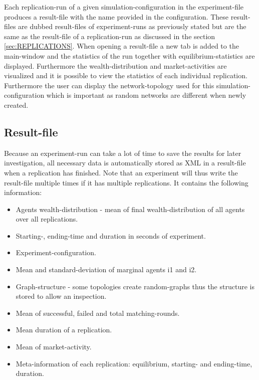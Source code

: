 \documentclass[Bachelorarbeit.tex]{subfiles}
\begin{document}
\medskip

Each replication-run of a given simulation-configuration in the experiment-file produces a result-file with the name provided in the configuration. These result-files are dubbed result-files of experiment-runs as previously stated but are the same as the result-file of a replication-run as discussed in the section \ref{sec:REPLICATIONS}.
When opening a result-file a new tab is added to the main-window and the statistics of the run together with equilibrium-statistics are displayed. Furthermore the wealth-distribution and market-activities are visualized and it is possible to view the statistics of each individual replication. Furthermore the user can display the network-topology used for this simulation-configuration which is important as random networks are different when newly created.

\subsection{Result-file}
Because an experiment-run can take a lot of time to save the results for later investigation, all necessary data is automatically stored as XML in a result-file when a replication has finished. Note that an experiment will thus write the result-file multiple times if it has multiple replications. It contains the following information:

\begin{itemize}
\item Agents wealth-distribution - mean of final wealth-distribution of all agents over all replications.
\item Starting-, ending-time and duration in seconds of experiment.
\item Experiment-configuration.
\item Mean and standard-deviation of marginal agents i1 and i2.
\item Graph-structure - some topologies create random-graphs thus the structure is stored to allow an inspection.
\item Mean of successful, failed and total matching-rounds.
\item Mean duration of a replication.
\item Mean of market-activity.
\item Meta-information of each replication: equilibrium, starting- and ending-time, duration.
\end{itemize}
\end{document}
